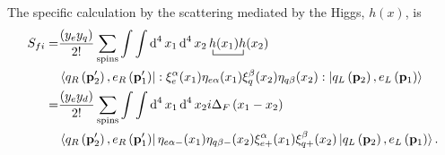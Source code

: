 The specific calculation by the scattering mediated by the Higgs, $h(x)$, is 
\begin{align}
  S_{fi}=&\frac{\left(y_ey_q \right)}{2!}\sum_{\text{spins}}\int\int \operatorname{d}^4x_1 \operatorname{d}^4x_2
\bcontraction{\,}{h}{(x_1)}{h}\,h(x_1)h(x_2) \nonumber\\
&\left\langle q_R \left(\mathbf{p}'_2\right),e_R\left(\mathbf{p}'_1\right) \right|
  : \xi^{\alpha}_{e}(x_1)\eta_{e\alpha}(x_1)
    \xi^{\beta}_{q}(x_2)\eta_{q\beta}(x_2):
 \left| q_L\left(\mathbf{p}_2\right) ,e_L \left(\mathbf{p}_1\right)  \right\rangle \nonumber\\
=&\frac{\left( y_ey_d \right)}{2!}\sum_{\text{spins}}\int\int \operatorname{d}^4x_1 \operatorname{d}^4x_2
i\Delta_F \left( x_1-x_2 \right)\nonumber\\
&\left\langle q_R \left(\mathbf{p}'_2\right),e_R\left(\mathbf{p}'_1\right)\right|
   \eta_{e\alpha-}(x_1)\eta_{q\beta-}(x_2) \xi^{\alpha}_{e+}(x_1)\xi^{\beta}_{q+}(x_2)
 \left| q_L\left(\mathbf{p}_2\right), e_L \left(\mathbf{p}_1\right)\right\rangle. 
\end{align}



